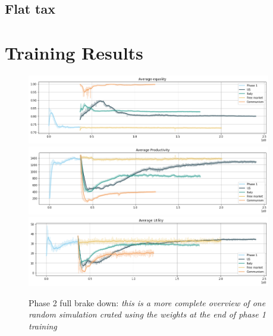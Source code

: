 \subsection{Flat tax}



\section{Training Results}


\begin{figure}[h!]
    \centering
    \includegraphics[width=0.95\textwidth]{Resources/imgs/equality_training.png}
    \includegraphics[width=0.95\textwidth]{Resources/imgs/productivity_training.png}
    \includegraphics[width=0.95\textwidth]{Resources/imgs/utility_training.png}
    \caption[Phase 1 full brake down: ]%
    {\label{img:p1_brakedown}Phase 2 full brake down: \small \textit{this is a more complete overview of one random simulation crated using the weights at the end of phase 1 training}}
\end{figure}
